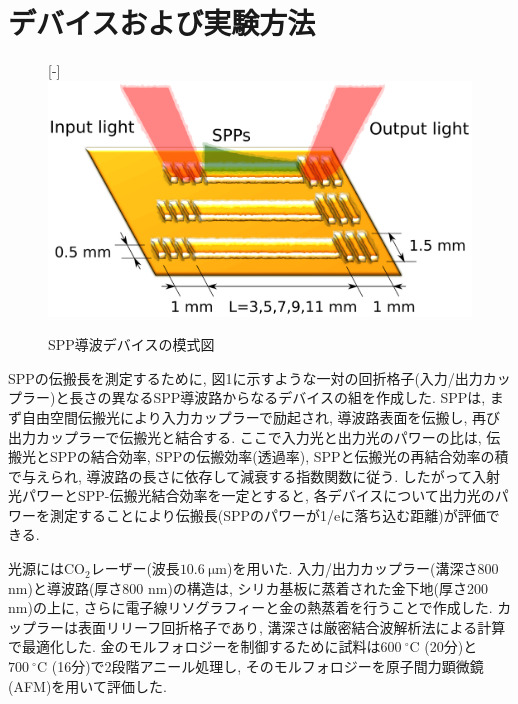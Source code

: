 \documentclass[a4,10truept]{jsarticle}
\begin{document}
\section{デバイスおよび実験方法}
\vspace{-0.5em}
\setlength{\columnsep}{1em}%
\begin{figure}
  \centering
  \raisebox{0pt}[\dimexpr\height-\baselineskip\relax]{\includegraphics[width=\hsize]{schematic.eps}}
    \caption{SPP導波デバイスの模式図}
     \label{fig:schematic}
\end{figure}
SPPの伝搬長を測定するために, 図1に示すような一対の回折格子(入力/出力カップラー)と長さの異なるSPP導波路からなるデバイスの組を作成した. SPPは, まず自由空間伝搬光により入力カップラーで励起され, 導波路表面を伝搬し, 再び出力カップラーで伝搬光と結合する. ここで入力光と出力光のパワーの比は, 伝搬光とSPPの結合効率, SPPの伝搬効率(透過率), SPPと伝搬光の再結合効率の積で与えられ, 導波路の長さに依存して減衰する指数関数に従う. したがって入射光パワーとSPP-伝搬光結合効率を一定とすると, 各デバイスについて出力光のパワーを測定することにより伝搬長(SPPのパワーが1/eに落ち込む距離)が評価できる. 

光源には$\mathrm{CO_2}\!$レーザー(波長$10.6\:\mathrm{\mu m}$)を用いた. 入力/出力カップラー(溝深さ800 nm)と導波路(厚さ800 nm)の構造は, シリカ基板に蒸着された金下地(厚さ200 nm)の上に, さらに電子線リソグラフィーと金の熱蒸着を行うことで作成した. カップラーは表面リリーフ回折格子であり, 溝深さは厳密結合波解析法による計算で最適化した. 
金のモルフォロジーを制御するために試料は$600\:\mathrm{^\circ C}$ (20分)と$700\:\mathrm{^\circ C}$ (16分)で2段階アニール処理し, そのモルフォロジーを原子間力顕微鏡(AFM)を用いて評価した.

\vspace{-0.2em}
\end{document}
